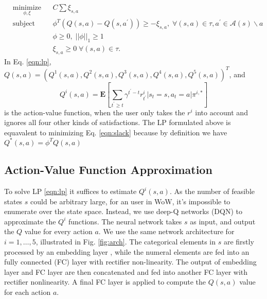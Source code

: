 \documentclass[a4paper]{article}
\begin{document}
\begin{equation}
\begin{aligned}
& \underset{\phi, \xi}{\text{minimize}}
& & C\sum \xi_{s,a} \\
& \text{subject to}
& & \phi^T(Q(s,a)-Q(s,a^\prime)) \geq - \xi_{s,a}, \; \forall (s,a) \in \tau, a^\prime \in \mathcal{A}(s)\backslash a \\
&&& \phi \geq 0, \; ||\phi||_1\geq 1\\
&&& \xi_{s,a} \geq 0 \; \forall (s,a) \in \tau. 
\label{eqn:lp}
\end{aligned}
\end{equation}
In Eq. \eqref{eqn:lp}, $Q(s,a)=(Q^1(s,a), Q^2(s,a), Q^3(s,a), Q^4(s,a), Q^5(s,a))^T$, and
\begin{equation}
Q^i(s,a)=\mathbf{E}[\sum_{t^\prime\geq t}\gamma^{t^\prime-t}r^i_{t^\prime} | s_{t}=s, a_{t}=a | \pi^{i,\ast}] \label{eqn:qi}
\end{equation}
is the action-value function, when the user only takes the $r^i$ into account and ignores all four other kinds of satisfactions. The LP formulated above is equavalent to minimizing Eq. \eqref{eqn:slack} because by definition we have $Q^*(s,a)=\phi^TQ(s,a)$

\subsection{Action-Value Function Approximation}

To solve LP \eqref{eqn:lp} it suffices to estimate $Q^i(s,a)$. As the number of feasible states $s$ could be arbitrary large, for an user in WoW, it's impossible to enumerate over the state space. Instead, we use deep-Q networks (DQN) \cite{} to approximate the $Q^i$ functions. The neural network takes $s$ as input, and output the $Q$ value for every action $a$. We use the same network architecture for $i=1,\dots,5$, illustrated in Fig. \ref{fig:arch}. The categorical elements in $s$ are firstly processed by an embedding layer \cite{}, while the numeral elements are fed into an fully connected (FC) layer with rectifier non-linearity. The output of embedding layer and FC layer are then concatenated and fed into another FC layer with rectifier nonlinearity. A final FC layer is applied to compute the $Q(s,a)$ value for each action $a$.
\end{document}
